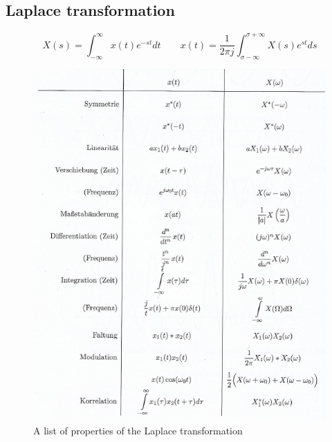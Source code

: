 \documentclass[10pt,a4paper]{article}
\begin{document}
\subsection{Laplace transformation}
$$
X(s) = \int_{-\infty}^{\infty} x(t)e^{-st}dt \qquad
x(t) = \frac{1}{2\pi j} \int_{\sigma-\infty}^{\sigma+\infty} X(s)e^{st}ds
$$
\begin{figure}[H]
\centering
\includegraphics[scale=1]{FourierContProperties.PNG}
\caption{A list of properties of the Laplace transformation}
\label{FourierContProperties}
\end{figure}
\end{document}
